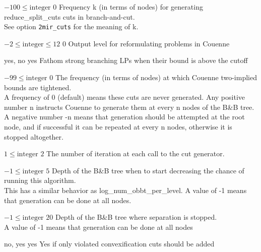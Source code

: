 %
{$-100\leq\textrm{integer}$}%
{$0$}%
{Frequency k (in terms of nodes) for generating reduce\_split\_cuts cuts in branch-and-cut.\\
See option \texttt{2mir\_cuts} for the meaning of k.}%
{}

%
{$-2\leq\textrm{integer}\leq12$}%
{$0$}%
{Output level for reformulating problems in Couenne}%
{}

%
{\ttfamily yes, no}%
{yes}%
{Fathom strong branching LPs when their bound is above the cutoff}%
{}

%
{$-99\leq\textrm{integer}$}%
{$0$}%
{The frequency (in terms of nodes) at which Couenne two-implied bounds are tightened.\\
A frequency of 0 (default) means these cuts are never generated. Any positive number n instructs Couenne to generate them at every n nodes of the B\&B tree. A negative number -n means that generation should be attempted at the root node, and if successful it can be repeated at every n nodes, otherwise it is stopped altogether.}%
{}

%
{$1\leq\textrm{integer}$}%
{$2$}%
{The number of iteration at each call to the cut generator.}%
{}

%
{$-1\leq\textrm{integer}$}%
{$5$}%
{Depth of the B\&B tree when to start decreasing the chance of running this algorithm.\\
This has a similar behavior as log\_num\_obbt\_per\_level. A value of -1 means that generation can be done at all nodes.}%
{}

%
{$-1\leq\textrm{integer}$}%
{$20$}%
{Depth of the B\&B tree where separation is stopped.\\
A value of -1 means that generation can be done at all nodes}%
{}

%
{\ttfamily no, yes}%
{yes}%
{Yes if only violated convexification cuts should be added}%
{}

